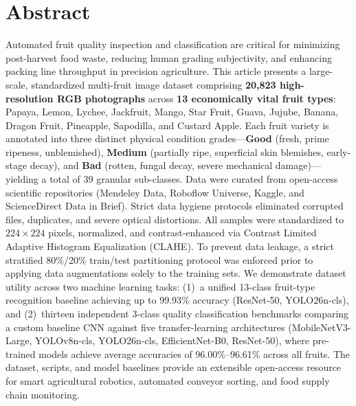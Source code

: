 \documentclass[11pt,a4paper]{article}
\begin{document}
\section{Abstract}
Automated fruit quality inspection and classification are critical for minimizing post-harvest food waste, reducing human grading subjectivity, and enhancing packing line throughput in precision agriculture. This article presents a large-scale, standardized multi-fruit image dataset comprising \textbf{20,823 high-resolution RGB photographs} across \textbf{13 economically vital fruit types}: Papaya, Lemon, Lychee, Jackfruit, Mango, Star Fruit, Guava, Jujube, Banana, Dragon Fruit, Pineapple, Sapodilla, and Custard Apple. Each fruit variety is annotated into three distinct physical condition grades---\textbf{Good} (fresh, prime ripeness, unblemished), \textbf{Medium} (partially ripe, superficial skin blemishes, early-stage decay), and \textbf{Bad} (rotten, fungal decay, severe mechanical damage)---yielding a total of 39 granular sub-classes. Data were curated from open-access scientific repositories (Mendeley Data, Roboflow Universe, Kaggle, and ScienceDirect Data in Brief). Strict data hygiene protocols eliminated corrupted files, duplicates, and severe optical distortions. All samples were standardized to $224 \times 224$ pixels, normalized, and contrast-enhanced via Contrast Limited Adaptive Histogram Equalization (CLAHE). To prevent data leakage, a strict stratified 80\%/20\% train/test partitioning protocol was enforced prior to applying data augmentations solely to the training sets. We demonstrate dataset utility across two machine learning tasks: (1)~a unified 13-class fruit-type recognition baseline achieving up to 99.93\% accuracy (ResNet-50, YOLO26n-cls), and (2)~thirteen independent 3-class quality classification benchmarks comparing a custom baseline CNN against five transfer-learning architectures (MobileNetV3-Large, YOLOv8n-cls, YOLO26n-cls, EfficientNet-B0, ResNet-50), where pre-trained models achieve average accuracies of 96.00\%--96.61\% across all fruits. The dataset, scripts, and model baselines provide an extensible open-access resource for smart agricultural robotics, automated conveyor sorting, and food supply chain monitoring.

\end{document}
